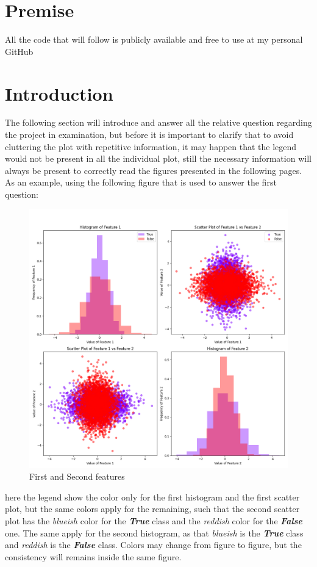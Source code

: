 \documentclass[a4paper, 12pt, english]{article}
\begin{document}
    \newpage
    \tableofcontents

    \newpage
    \section*{Premise}
    All the code that will follow is publicly available and free to use at my personal GitHub~\cite{nickrepository}


    \section*{Introduction}
    The following section will introduce and answer all the relative question regarding the project in examination, but before it is important to clarify that to avoid cluttering the plot with repetitive information, it may happen that the legend would not be present in all the individual plot, still the necessary information will always be present to correctly read the figures presented in the following pages.
    As an example, using the following figure that is used to answer the first question:
    \begin{figure}[H]
        \centering
        \includegraphics[width=0.7\linewidth]{img/projects/project1/1-2.png}
        \caption{First and Second features}\label{fig:project1:1-2}
    \end{figure}
    here the legend show the color only for the first histogram and the first scatter plot, but the same colors apply for the remaining, such that the second scatter plot has the \textit{blueish} color for the \textbf{\textit{True}} class and the \textit{reddish} color for the \textbf{\textit{False}} one. The same apply for the second histogram, as that \textit{blueish} is the \textbf{\textit{True}} class and \textit{reddish} is the \textbf{\textit{False}} class. Colors may change from figure to figure, but the consistency will remains inside the same figure.
\end{document}
